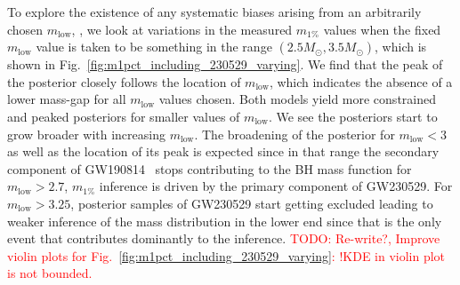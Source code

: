 \documentclass[modern]{aastex631}
\newcommand{\todo}[1]{\textcolor{red}{TODO: #1}}
\begin{document}
To explore the existence of any systematic biases arising from an arbitrarily
chosen $m_\mathrm{low}$, , we look at variations
in the measured $m_{1\%}$ values when the fixed $m_\mathrm{low}$ value is taken
to be something in the range $(2.5M_{\odot},3.5M_{\odot})$, which is shown in
Fig.~\ref{fig:m1pct_including_230529_varying}. We find that the peak of the
posterior closely follows the location of $m_\mathrm{low}$, which indicates the
absence of a lower mass-gap for all $m_\mathrm{low}$ values chosen. Both models
yield more constrained and peaked posteriors for smaller values of
$m_{\mathrm{low}}$. We see the posteriors start to grow broader with increasing
$m_\mathrm{low}$. The broadening of the posterior for $m_\mathrm{low}<3$ as well
as the location of its peak is expected since in that range the secondary
component of GW190814~\citep{LIGOScientific:2020zkf} stops contributing to the
BH mass function for $m_\mathrm{low}>2.7$,  $m_{1\%}$ inference is driven by the primary component of
GW230529. For  $m_\mathrm{low}>3.25$, posterior samples of GW230529 start
getting excluded leading to weaker inference of the mass distribution in the
lower end since that is the only event that contributes dominantly to the
inference. \todo{Re-write?, Improve violin plots for
Fig.~\ref{fig:m1pct_including_230529_varying}: !KDE in violin plot is not
bounded.}


\end{document}

